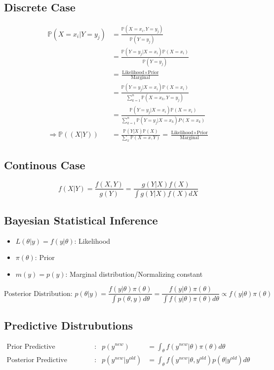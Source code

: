 \documentclass[12pt]{article}
\theoremstyle{definition}
\newcommand{\Prob}[1]{\mathbb{P}(#1)}
\begin{document}
    \subsection*{Discrete Case}
    \begin{align*}
        \Prob{X=x_i| Y = y_j} &= \frac{\Prob{X = x_i, Y = y_j}}{\Prob{Y = y_j}}\\
        &= \frac{\Prob{Y = y_j|X=x_i} \Prob{X = x_i}}{\Prob{Y = y_j}}\\
        &= \frac{\text{Likelihood}\times \text{Prior}}{\text{Marginal}}\\
        &= \frac{\Prob{Y = y_j|X=x_i} \Prob{X = x_i}}{\sum_{k=1}^n\Prob{X = x_k,Y = y_j}}\\
        &= \frac{\Prob{Y = y_j|X=x_i} \Prob{X = x_i}}{\sum_{k=1}^n\Prob{Y = y_j|X = x_k}P(X = x_k)}\\
        \Rightarrow \Prob{(X|Y)} &= \frac{\Prob{Y|X} \Prob{X}}{\sum_x \Prob{X = x,Y}} = \frac{\text{Likelihood}\times \text{Prior}}{\text{Marginal}} 
    \end{align*}
    \subsection*{Continous Case}
        $$f(X|Y) = \frac{f(X,Y)}{g(Y)} = \frac{g(Y|X) f(X)}{\int g(Y|X)f(X) dX}$$

\subsection*{Bayesian Statistical Inference}
\begin{itemize}
    \item $L(\theta|y) = f(y|\theta)$: Likelihood
    \item $\pi(\theta)$: Prior
    \item $m(y) = p(y)$: Marginal distribution/Normalizing constant
\end{itemize}
$$\text{Posterior Distribution: } p(\theta|y) = \frac{f(y|\theta)\pi(\theta)}{\int p(\theta,y)d\theta} = \frac{f(y|\theta)\pi(\theta)}{\int f(y|\theta)\pi(\theta) d\theta} \propto f(y|\theta)\pi(\theta)$$
\subsection*{Predictive Distrubutions}
\begin{align*}
    \text{Prior Predictive Distribution} &\text{:} &p(y^{new}) &= \int_\theta f(y^{new}|\theta)\pi(\theta)d\theta\\
    \text{Posterior Predictive Distribution} &\text{:} &p(y^{new}|y^{old}) &= \int_\theta f(y^{new}|\theta,y^{old})p(\theta|y^{old})d\theta
\end{align*}
\end{document}
